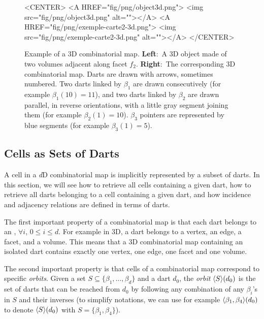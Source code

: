 \begin{figure}
\begin{ccHtmlOnly}
    <CENTER>
    <A HREF="fig/png/object3d.png">
    <img src="fig/png/object3d.png" alt=""></A>
    <A HREF="fig/png/exemple-carte2-3d.png">
        <img src="fig/png/exemple-carte2-3d.png" alt=""></A>
    </CENTER>
    \end{ccHtmlOnly}
    \caption{Example of a 3D combinatorial map. \textbf{Left}:~A 3D object
      made of two volumes adjacent along facet $f_2$. \textbf{Right}:~The
      corresponding 3D combinatorial map.  Darts are drawn with
      arrows, sometimes numbered.  Two darts linked by $\beta_1$ are
      drawn consecutively (for example $\beta_1(10)=11$), and two
      darts linked by $\beta_2$ are drawn parallel, in reverse
      orientations, with a little gray segment joining them (for
      example $\beta_2(1)=10$).  $\beta_3$ pointers are represented by
      blue segments (for example $\beta_3(1)=5$).}
    \label{fig-exemple-carte3d}
\end{figure}

\subsection{Cells as Sets of Darts}\label{ssec-cells-in-map}
A cell in a \emph{d}D combinatorial map is implicitly represented by a
subset of darts.
In this section, we will see how to retrieve all cells containing a
given dart, how to retrieve all darts belonging to a cell containing a
given dart, and how incidence and adjacency relations are defined in
terms of darts.

The first important property of a combinatorial map is that
each dart belongs to an , $\forall i$, $0 \leq i \leq d$.
For example in 3D, a dart belongs to a vertex, an edge, a facet, and a
volume. This means that a 3D combinatorial map containing an isolated
dart contains exactly one vertex, one edge, one facet and one volume.


The second important property is that cells of a combinatorial map
correspond to specific \emph{orbits}.  Given a set 
$S \subseteq \{\beta_1,\ldots,\beta_d\}$ and a dart
$d_0$, the \emph{orbit} $\langle{}S\rangle{}(d_0)$ is the set of darts that can be
reached from $d_0$ by following any combination of any $\beta_i$'s in $S$
and their inverses (to simplify notations, we can use for example
$\langle{}\beta_1,\beta_4\rangle{}(d_0)$ to denote $\langle{}S\rangle{}(d_0)$ with
$S=\{\beta_1,\beta_4\}$).

